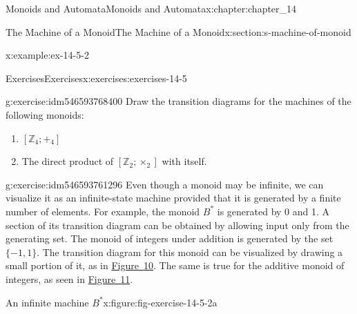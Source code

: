 \documentclass[oneside,10pt,]{book}
\numberwithin{equation}{section}
\begin{document}
\begin{chapterptx}{Monoids and Automata}{}{Monoids and Automata}{}{}{x:chapter:chapter_14}
\begin{sectionptx}{The Machine of a Monoid}{}{The Machine of a Monoid}{}{}{x:section:s-machine-of-monoid}
\begin{example}{}{x:example:ex-14-5-2}
\end{example}
%
%
\typeout{************************************************}
\typeout{************************************************}
%
\begin{exercises-subsection}{Exercises}{}{Exercises}{}{}{x:exercises:exercises-14-5}
\begin{divisionexercise}{1}{}{}{g:exercise:idm546593768400}%
Draw the transition diagrams for the machines of the following monoids:%
\begin{enumerate}[label=(\alph*)]
\item{}\(\left[\mathbb{Z}_4;+_4\right]\)%
\item{}The direct product of  \(\left[\mathbb{Z}_2;\times _2\right]\) with itself.%
\end{enumerate}
%
\end{divisionexercise}%
\begin{divisionexercise}{2}{}{}{g:exercise:idm546593761296}%
Even though a monoid may be infinite, we can visualize it as an infinite-state machine provided that it is generated by a finite number of elements. For example, the monoid \(B^*\) is generated by 0 and 1. A section of its transition diagram can be obtained by allowing input only from the generating set. The monoid of integers under addition is generated by the set \(\{-1, 1\}\). The transition diagram for this monoid can be visualized by drawing a small portion of it, as in \hyperref[x:figure:fig-exercise-14-5-2a]{Figure~10}. The same is true for the additive monoid of integers, as seen in \hyperref[x:figure:fig-exercise-14-5-2b]{Figure~11}.%
\begin{figureptx}{An infinite machine \(B^*\)}{x:figure:fig-exercise-14-5-2a}{}%
\begin{image}{0.15}{0.7}{0.15}%

\end{image}
\end{figureptx}
\end{divisionexercise}
\end{exercises-subsection}
\end{sectionptx}
\end{chapterptx}
\end{document}
